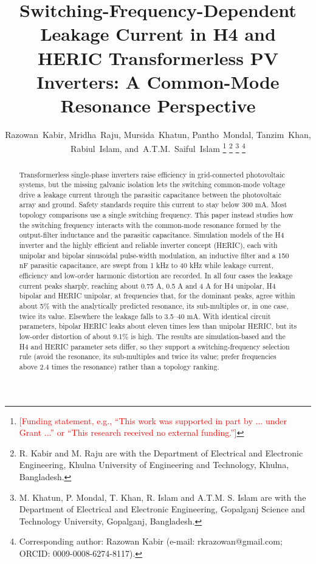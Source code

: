 \documentclass[journal]{IEEEtran}
\newcommand{\todo}[1]{\textcolor{red}{[#1]}}
\begin{document}
\title{Switching-Frequency-Dependent Leakage Current in H4 and HERIC Transformerless PV Inverters: A Common-Mode Resonance Perspective}

\author{Razowan~Kabir,
        Mridha~Raju,
        Mursida~Khatun,
        Pantho~Mondal,
        Tanzim~Khan,
        Rabiul~Islam,
        and~A.T.M.~Saiful~Islam%
\thanks{\todo{Funding statement, e.g., ``This work was supported in part by ... under Grant ...'' or ``This research received no external funding.''}}%
\thanks{R. Kabir and M. Raju are with the Department of Electrical and Electronic Engineering, Khulna University of Engineering and Technology, Khulna, Bangladesh.}%
\thanks{M. Khatun, P. Mondal, T. Khan, R. Islam and A.T.M. S. Islam are with the Department of Electrical and Electronic Engineering, Gopalganj Science and Technology University, Gopalganj, Bangladesh.}%
\thanks{Corresponding author: Razowan Kabir (e-mail: rkrazowan@gmail.com; ORCID: 0009-0008-6274-8117).}}


\maketitle

\begin{abstract}
Transformerless single-phase inverters raise efficiency in grid-connected photovoltaic systems, but the missing galvanic isolation lets the switching common-mode voltage drive a leakage current through the parasitic capacitance between the photovoltaic array and ground. Safety standards require this current to stay below 300 mA. Most topology comparisons use a single switching frequency. This paper instead studies how the switching frequency interacts with the common-mode resonance formed by the output-filter inductance and the parasitic capacitance. Simulation models of the H4 inverter and the highly efficient and reliable inverter concept (HERIC), each with unipolar and bipolar sinusoidal pulse-width modulation, an inductive filter and a 150 nF parasitic capacitance, are swept from 1 kHz to 40 kHz while leakage current, efficiency and low-order harmonic distortion are recorded. In all four cases the leakage current peaks sharply, reaching about 0.75 A, 0.5 A and 4 A for H4 unipolar, H4 bipolar and HERIC unipolar, at frequencies that, for the dominant peaks, agree within about 5\% with the analytically predicted resonance, its sub-multiples or, in one case, twice its value. Elsewhere the leakage falls to 3.5--40 mA. With identical circuit parameters, bipolar HERIC leaks about eleven times less than unipolar HERIC, but its low-order distortion of about 9.1\% is high. The results are simulation-based and the H4 and HERIC parameter sets differ, so they support a switching-frequency selection rule (avoid the resonance, its sub-multiples and twice its value; prefer frequencies above 2.4 times the resonance) rather than a topology ranking.
\end{abstract}
\end{document}
